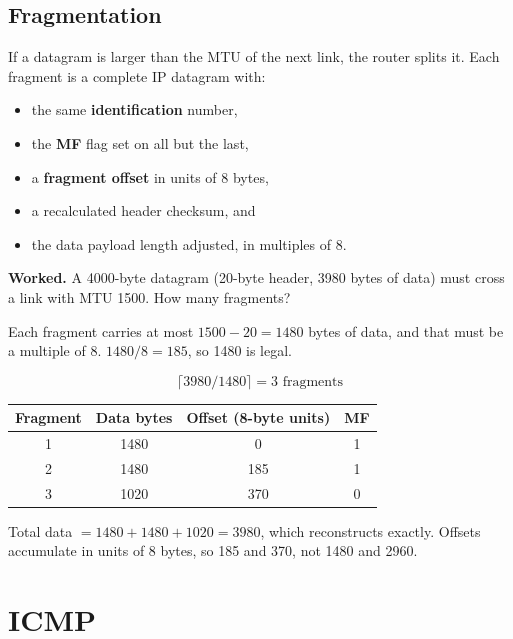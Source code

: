 \documentclass[11pt,a4paper]{article}
\begin{document}
\subsection{Fragmentation}

If a datagram is larger than the MTU of the next link, the router splits it. Each fragment is a complete IP datagram with:

\begin{itemize}
\item the same \textbf{identification} number,
\item the \textbf{MF} flag set on all but the last,
\item a \textbf{fragment offset} in units of 8 bytes,
\item a recalculated header checksum, and
\item the data payload length adjusted, in multiples of 8.
\end{itemize}

\begin{exambox}
\textbf{Worked.} A 4000-byte datagram (20-byte header, 3980 bytes of data) must cross a link with MTU 1500. How many fragments?
\end{exambox}

\begin{solbox}
Each fragment carries at most $1500 - 20 = 1480$ bytes of data, and that must be a multiple of 8. $1480/8 = 185$, so 1480 is legal.

\[
\lceil 3980 / 1480 \rceil = 3 \text{ fragments}
\]

\begin{center}\small
\begin{tabular}{c c c c}
\toprule Fragment & Data bytes & Offset (8-byte units) & MF\\
\midrule
1 & 1480 & 0 & 1\\
2 & 1480 & 185 & 1\\
3 & 1020 & 370 & 0\\
\bottomrule
\end{tabular}
\end{center}

Total data $= 1480 + 1480 + 1020 = 3980$, which reconstructs exactly. Offsets accumulate in units of 8 bytes, so 185 and 370, not 1480 and 2960.
\end{solbox}

\section{ICMP}
\end{document}
